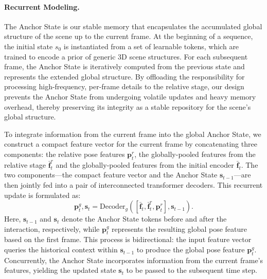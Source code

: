 \paragraph{Recurrent Modeling.}
The Anchor State is our stable memory that encapsulates the accumulated global structure of the scene up to the current frame. At the beginning of a sequence, the initial state $s_0$ is instantiated from a set of learnable tokens, which are trained to encode a prior of generic 3D scene structures. For each subsequent frame, the Anchor State is iteratively computed from the previous state and represents the extended global structure. By offloading the responsibility for processing high-frequency, per-frame details to the relative stage, our design prevents the Anchor State from undergoing volatile updates and heavy memory overhead, thereby preserving its integrity as a stable repository for the scene's global structure.

To integrate information from the current frame into the global Anchor State, we construct a compact feature vector for the current frame by concatenating three components: the relative pose features $\mathbf{p}^r_t$, the globally-pooled features from the relative stage $\mathbf{\bar{f}}^r_t$ and the globally-pooled features from the initial encoder $\mathbf{\bar{f}}_t$. The two components—the compact feature vector and the Anchor State $\mathbf{s}_{t-1}$—are then jointly fed into a pair of interconnected transformer decoders. This recurrent update is formulated as:
\begin{equation}
 \mathbf{p}^{g}_t, \mathbf{s}_t= \text{Decoder}_{g}([\mathbf{\bar{f}}_t, \mathbf{\bar{f}}^r_t, \mathbf{p}^r_t], \mathbf{s}_{t-1}).
\end{equation}
Here, $\mathbf{s}_{t-1}$ and $\mathbf{s}_t$ denote the Anchor State tokens before and after the interaction, respectively, while $\mathbf{p}^{g}_t$ represents the resulting global pose feature based on the first frame. This process is bidirectional: the input feature vector queries the historical context within $\mathbf{s}_{t-1}$ to produce the global pose feature $\mathbf{p}^g_t$. Concurrently, the Anchor State incorporates information from the current frame's features, yielding the updated state $\mathbf{s}_{t}$ to be passed to the subsequent time step. 

